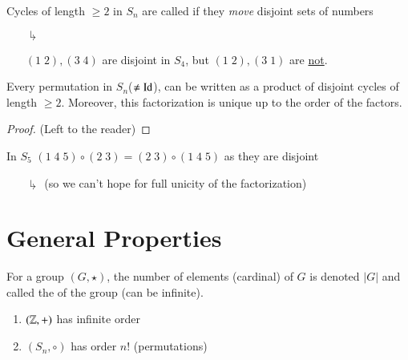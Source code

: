 \begin{defn}
    Cycles of length $\geq 2$ in $S_n$ are called  if they \emph{move} disjoint sets of numbers
    \begin{enumerate}
        \item[$\drsh$] \begin{eg}
            $(1\;2), (3\;4)$ are disjoint in $S_4$, but $(1\;2),(3\;1)$ are \underline{not}.
        \end{eg} 
    \end{enumerate}
\end{defn}


\begin{rmk}
    Every permutation in $S_n$($\neq \operatorname{Id}$), can be written as a product of disjoint cycles of length $\geq 2$. Moreover, this factorization is unique up to the order of the factors.
    \begin{proof}
        (Left to the reader)
    \end{proof}
\end{rmk}

\begin{eg}
    In $S_5$ $(1\;4\;5)\circ(2\;3) = (2\;3) \circ(1\;4\;5)$ as they are disjoint
    \begin{enumerate}
        \item[$\drsh$] (so we can't hope for full unicity of the factorization) 
    \end{enumerate}
\end{eg}


\section{\textsection General Properties}

\begin{defn}
    For a group $(G, \star)$, the number of elements (cardinal) of $G$ is denoted $|G|$ and called the  of the group (can be infinite).
\end{defn}

\begin{eg}
    \begin{enumerate}
        \item $(\mathbb Z,+)$ has infinite order
        \item $(S_n,\circ)$ has order $n!$ (permutations)
    \end{enumerate}
\end{eg}

